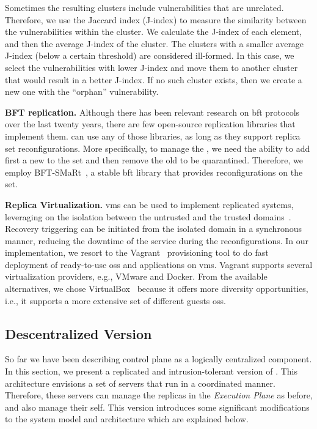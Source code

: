 Sometimes the resulting clusters include vulnerabilities that are unrelated. Therefore, we use the Jaccard index (J-index) to measure the similarity between the vulnerabilities within the cluster. We calculate the J-index of each element, and then the average J-index of the cluster. 
The clusters with a smaller average J-index (below a certain threshold) are considered ill-formed. In this case, we select the vulnerabilities with lower J-index and move them to another cluster that would result in a better J-index. If no such cluster exists, then we create a new one with the ``orphan'' vulnerability.

\textbf{BFT replication.}
Although there has been relevant research on \gls{bft} protocols over the last twenty years, there are few open-source replication libraries that implement them. \system can use any of those libraries, as long as they support replica set reconfigurations.
More specifically, to manage the \replicas, we need the ability to add first a new \replica to the set and then remove the old \replica to be quarantined. 
Therefore, we employ BFT-SMaRt~\cite{Bessani:2014}, a stable \gls{bft} library that provides reconfigurations on the \replicas set.

\textbf{Replica Virtualization.}
\glspl{vm} can be used to implement replicated systems, leveraging on the isolation between the untrusted and the trusted domains~\cite{Sousa:2010,Platania:2014,Distler:2011,Dettoni:2013}.
Recovery triggering can be initiated from the isolated domain in a synchronous manner, reducing the downtime of the service during the reconfigurations. 
In our implementation, we resort to the Vagrant~\cite{vagrant} provisioning tool to do fast deployment of ready-to-use \glspl{os} and applications on \glspl{vm}. 
Vagrant supports several virtualization providers, e.g., VMware and Docker. 
From the available alternatives, we chose VirtualBox~\cite{virtualbox} because it offers more diversity opportunities, i.e., it supports a more extensive set of different guests \glspl{os}.

\subsection{Descentralized \system Version}
So far we have been describing \system control plane as a logically centralized component. 
In this section, we present a replicated and intrusion-tolerant version of \system.
This architecture envisions a set of servers that run \system in a coordinated manner. 
Therefore, these servers can manage the replicas in the \emph{Execution Plane} as before, and also manage their self.
This version introduces some significant modifications to the system model and architecture which are explained below.

